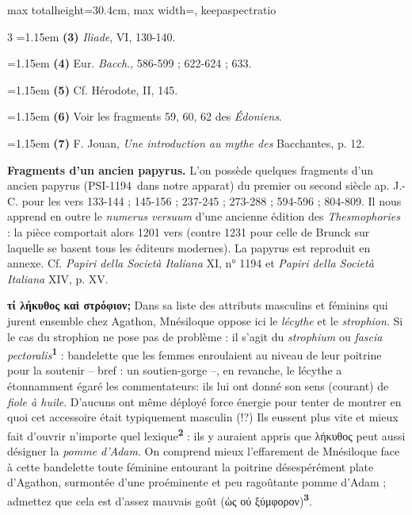 \documentclass[11pt,twoside]{book}
\newcommand{\italique}[1]{\textit{#1}}
\newcommand{\PsiUn}{PSI-1194}
\newcommand{\latin}[1]{\textit{#1}}
\newcommand{\marqueur}[1]{\textsuperscript{\color{rubricRed}\textbf{#1}}}
\begin{document}
\begin{adjustbox}{max totalheight=30.4cm, max width=\textwidth, keepaspectratio}
\begin{minipage}{\textwidth}
{\begin{multicols}{3}
\noindent\hangindent=1.15em {\color{sepiaNote}\textbf{(3)}} \italique{Iliade}, VI, 130-140.
\par\vspace{1.5pt}
\noindent\hangindent=1.15em {\color{sepiaNote}\textbf{(4)}} Eur. \italique{Bacch}., 586-599 ; 622-624 ; 633.
\par\vspace{1.5pt}
\noindent\hangindent=1.15em {\color{sepiaNote}\textbf{(5)}} Cf. Hérodote, II, 145.
\par\vspace{1.5pt}
\noindent\hangindent=1.15em {\color{sepiaNote}\textbf{(6)}} Voir les fragments 59, 60, 62 des \italique{Édoniens}.
\par\vspace{1.5pt}
\noindent\hangindent=1.15em {\color{sepiaNote}\textbf{(7)}} F. Jouan, \italique{Une introduction au mythe des} Bacchantes, p. 12.
\par\vspace{1.5pt}
 \textbf{Fragments d'un ancien papyrus.} L'on possède quelques fragments d'un ancien papyrus (\PsiUn \ dans notre apparat) du premier ou second siècle ap. J.-C. pour les vers 133-144 ; 145-156 ; 237-245 ; 273-288 ; 594-596 ; 804-809. Il nous apprend en outre le \latin{numerus versuum} d'une ancienne édition des \italique{Thesmophories} : la pièce comportait alors 1201 vers (contre 1231 pour celle de Brunck sur laquelle se basent tous les éditeurs modernes). La papyrus est reproduit en annexe. Cf. \italique{Papiri della Società Italiana} XI, n° 1194 et  \italique{Papiri della Società Italiana} XIV, p. XV.
\par\vspace{1.5pt}
 \textbf{τί λήκυθος καὶ στρόφιον;} Dans sa liste des attributs masculins et féminins qui jurent ensemble chez Agathon, Mnésiloque oppose ici le \italique{lécythe} et le \italique{strophion}. Si le cas du strophion ne pose pas de problème : il s'agit du \latin{strophium} ou \latin{fascia pectoralis}\marqueur{1} : bandelette que les femmes enroulaient au niveau de leur poitrine pour la soutenir -- bref : un soutien-gorge --, en revanche, le lécythe a étonnamment égaré les commentateurs: ils lui ont donné son sens (courant) de \italique{fiole à huile}. D'aucuns ont même déployé force énergie pour tenter de montrer en quoi cet accessoire était typiquement masculin (!?)  Ils eussent plus vite et mieux fait d'ouvrir n'importe quel lexique\marqueur{2} : ils y auraient appris que λήκυθος peut aussi désigner la \italique{pomme d'Adam}. On comprend mieux l'effarement de Mnésiloque face à cette bandelette toute féminine entourant la poitrine désespérément plate d'Agathon, surmontée d'une proéminente et peu ragoûtante pomme d'Adam ; admettez que cela est d'assez mauvais goût (ὡς οὐ ξύμφορον)\marqueur{3}.

\end{multicols}}
\end{minipage}
\end{adjustbox}
\end{document}
